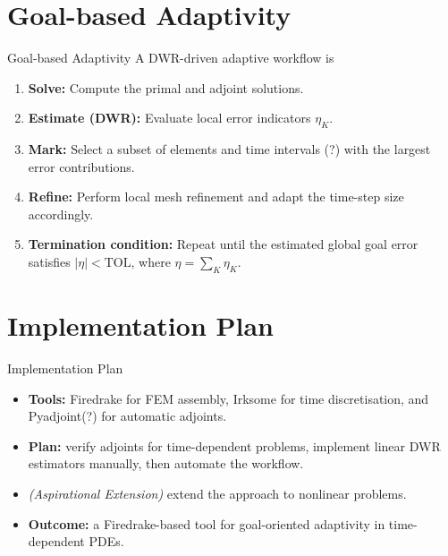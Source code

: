 \documentclass[aspectratio=169]{beamer}
\begin{document}
\section{Goal-based Adaptivity}
\begin{frame}{Goal-based Adaptivity}
    A DWR-driven adaptive workflow is
    \begin{enumerate}
        \item \textbf{Solve:} Compute the primal and adjoint solutions.
        \item \textbf{Estimate (DWR):} Evaluate local error indicators \(\eta_K\).
        \item \textbf{Mark:} Select a subset of elements and time intervals (?) with the largest error contributions.
        \item \textbf{Refine:} Perform local mesh refinement and adapt the time-step size accordingly.
        \item \textbf{Termination condition:} Repeat until the estimated global goal error satisfies \(|\eta| < \text{TOL}\), where \(\eta = \sum_K \eta_K\).
    \end{enumerate}
\end{frame}


\section{Implementation Plan}
\begin{frame}{Implementation Plan}
    \begin{itemize}
        \item \textbf{Tools:} Firedrake for FEM assembly, Irksome for time discretisation, and Pyadjoint(?) for automatic adjoints.
        \item \textbf{Plan:} verify adjoints for time-dependent problems, implement linear DWR estimators manually, then automate the workflow.
        \item \textit{(Aspirational Extension)} extend the approach to nonlinear problems.
        \item \textbf{Outcome:} a Firedrake-based tool for goal-oriented adaptivity in time-dependent PDEs.
    \end{itemize}
\end{frame}



\end{document}
